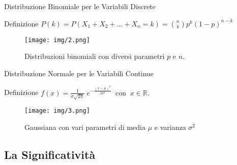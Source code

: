 \documentclass[10pt]{beamer}
\begin{document}
	\begin{frame}{Distribuzione Binomiale per le Variabili Discrete}

		\begin{alertblock}{Definizione}
	      $P(k)=P(X_1+X_2+...+X_n=k)=\binom{n}{k}p^k(1-p)^{n-k}$
		\end{alertblock}

		\begin{figure}[2]
			\texttt{[image: img/2.png]}
			\caption{\tiny{Distribuzioni binomiali con diversi parametri $p$ e $n$.}}
		\end{figure}

	\end{frame}

	\begin{frame}{Distribuzione Normale per le Variabili Continue}

		\begin{alertblock}{Definizione}
			$f(x)={\frac  {1}{\sigma {\sqrt  {2\pi }}}}\;e^{{-{\frac{\left(x-\mu \right)^{2}}{2\sigma ^{2}}}}}~{\mbox{ con }}~x\in {\mathbb  {R}}.$
		\end{alertblock}

		\begin{figure}[3]
			\texttt{[image: img/3.png]}
			\caption{\tiny{Gaussiana con vari parametri di media $\mu$ e varianza $\sigma^2$}}
		\end{figure}

	\end{frame}

	\subsection{La Significatività}
\end{document}
